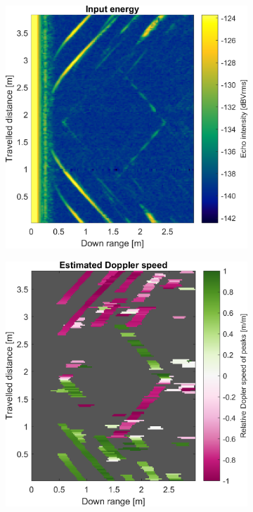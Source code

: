 \begin{figure}[htbp]
    \centering
    \begin{subfigure}[t]{0.475\linewidth}
        \centering
        \includegraphics[width=\linewidth,max height=.475\textheight]{gfx/results/jailcell_input.png}
    \end{subfigure}%
    \hfill%
    \begin{subfigure}[t]{0.475\linewidth}  
        \centering 
        \includegraphics[width=\linewidth,max height=.475\textheight]{gfx/results/jailcell_doppler.png}

\end{subfigure}
\end{figure}
